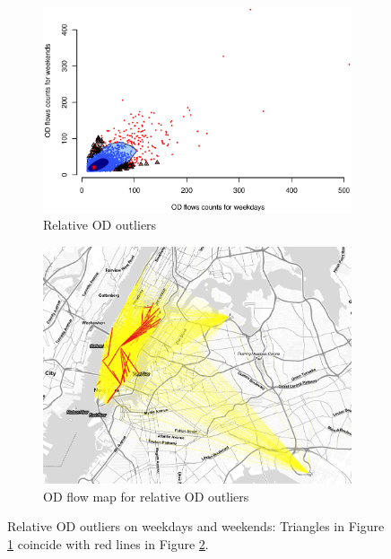 \documentclass[a4paper,UKenglish]{lipics-v2016}
\begin{document}
\begin{figure}
	\centering
	\begin{subfigure}[b]{0.49\textwidth}
		\includegraphics[width=\textwidth]{images/Outliers_rare_weekdays_weekends.eps}
		\caption{Relative OD outliers}
		\label{fig:weekdays_rare}
	\end{subfigure}
	\hfill %
	\begin{subfigure}[b]{0.49\textwidth}
		\includegraphics[width=\textwidth]{images/outliers_rare_weekdays_weekends.png}
		\caption{OD flow map for relative OD outliers}
		\label{fig:weekdays_rare_map}
	\end{subfigure}
	\caption{Relative OD outliers on weekdays and weekends: Triangles in Figure \ref{fig:weekdays_rare} coincide with red lines in Figure \ref{fig:weekdays_rare_map}. }\label{fig:weekdays_rare_OD_map}	
\end{figure}
\end{document}
